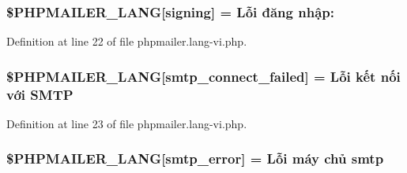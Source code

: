 \subsubsection[{\texorpdfstring{\$\+P\+H\+P\+M\+A\+I\+L\+E\+R\+\_\+\+L\+A\+NG}{$PHPMAILER_LANG}}]{\setlength{\rightskip}{0pt plus 5cm}\$P\+H\+P\+M\+A\+I\+L\+E\+R\+\_\+\+L\+A\+NG\mbox{[}\textquotesingle{}signing\textquotesingle{}\mbox{]} = \textquotesingle{}Lỗi đăng nhập\+: \textquotesingle{}}\hypertarget{phpmailer_8lang-vi_8php_a68e437bdb9b968a5a67320f03d231565}{}\label{phpmailer_8lang-vi_8php_a68e437bdb9b968a5a67320f03d231565}


Definition at line 22 of file phpmailer.\+lang-\/vi.\+php.

\subsubsection[{\texorpdfstring{\$\+P\+H\+P\+M\+A\+I\+L\+E\+R\+\_\+\+L\+A\+NG}{$PHPMAILER_LANG}}]{\setlength{\rightskip}{0pt plus 5cm}\$P\+H\+P\+M\+A\+I\+L\+E\+R\+\_\+\+L\+A\+NG\mbox{[}\textquotesingle{}smtp\+\_\+connect\+\_\+failed\textquotesingle{}\mbox{]} = \textquotesingle{}Lỗi kết nối với {\bf S\+M\+TP}\textquotesingle{}}\hypertarget{phpmailer_8lang-vi_8php_a7b321d4ca1e9df702403ed4c61aa0980}{}\label{phpmailer_8lang-vi_8php_a7b321d4ca1e9df702403ed4c61aa0980}


Definition at line 23 of file phpmailer.\+lang-\/vi.\+php.

\subsubsection[{\texorpdfstring{\$\+P\+H\+P\+M\+A\+I\+L\+E\+R\+\_\+\+L\+A\+NG}{$PHPMAILER_LANG}}]{\setlength{\rightskip}{0pt plus 5cm}\$P\+H\+P\+M\+A\+I\+L\+E\+R\+\_\+\+L\+A\+NG\mbox{[}\textquotesingle{}smtp\+\_\+error\textquotesingle{}\mbox{]} = \textquotesingle{}Lỗi máy chủ smtp \textquotesingle{}}\hypertarget{phpmailer_8lang-vi_8php_a7d9cffba1e669c845f8a4c891ee50064}{}\label{phpmailer_8lang-vi_8php_a7d9cffba1e669c845f8a4c891ee50064}


